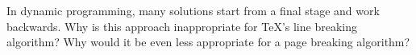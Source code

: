 In dynamic programming, many solutions start from a final stage and
work backwards. Why is this approach inappropriate for \TeX's
line breaking algorithm? Why would it be even less appropriate for a
page breaking algorithm?
